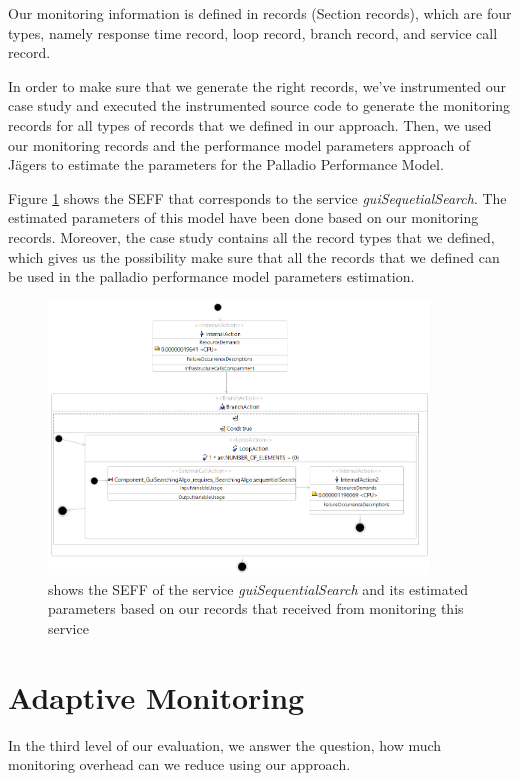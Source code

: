Our monitoring information is defined in records (Section records), which are four types, namely response time record, loop record, branch record, and service call record. 

In order to make sure that we generate the right records, we've instrumented our case study and executed the instrumented source code to generate the monitoring records for all types of records that we defined in our approach. Then, we used our monitoring records and the performance model parameters approach of Jägers \cite{jägers2018} to estimate the parameters for the Palladio Performance Model.

Figure \ref{fig:guiSequentialSearch_seff} shows the SEFF that corresponds to the service \textit{guiSequetialSearch}. The estimated parameters of this model have been done based on our monitoring records. Moreover, the case study contains all the record types that we defined, which gives us the possibility make sure that all the records that we defined can be used in the palladio performance model parameters estimation.


\begin{figure}[h]
\centering
\includegraphics[width=0.9\textwidth]{figures/records_evaluation}
\caption{shows the SEFF of the service \textit{guiSequentialSearch} and its estimated parameters based on our records that received from monitoring this service}
\label{fig:guiSequentialSearch_seff}
\end{figure}


\section{Adaptive Monitoring}
\label{sec:Adaptive Monitoring}
In the third level of our evaluation, we answer the question, how much monitoring overhead can we reduce using our approach. 

